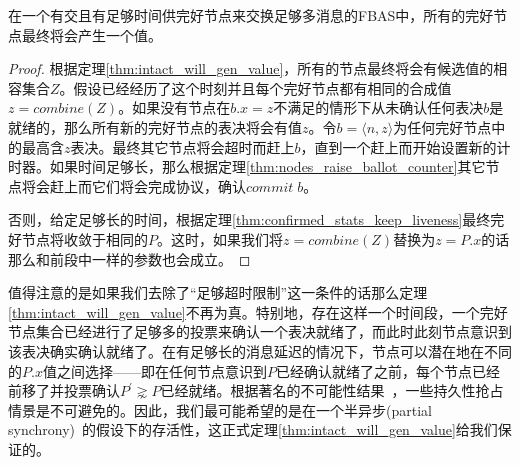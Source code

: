 \begin{theorem}\label{thm:intact_will_gen_value}
        在一个有{\quorum}交且有足够时间供完好节点来交换足够多消息的FBAS中，所有的完好节点最终将会产生一个值。
\end{theorem}

\begin{proof}
        根据定理\ref{thm:intact_will_gen_value}，所有的节点最终将会有候选值的相容集合$Z$。假设已经经历了这个时刻并且每个完好节点都有相同的合成值$z=combine(Z)$。如果没有节点在$b.x=z$不满足的情形下从未确认任何表决$b$是就绪的，那么所有新的完好节点的表决将会有值$z$。令$b=\langle n,z\rangle$为任何完好节点中的最高含$z$表决。最终其它节点将会超时而赶上$b$，直到一个{\quorum}赶上而开始设置新的计时器。如果时间足够长，那么根据定理\ref{thm:nodes_raise_ballot_counter}其它节点将会赶上而它们将会完成协议，确认$commit\;b$。
        
        否则，给定足够长的时间，根据定理\ref{thm:confirmed_stats_keep_liveness}最终完好节点将收敛于相同的$P$。这时，如果我们将$z=combine(Z)$替换为$z=P.x$的话那么和前段中一样的参数也会成立。
\end{proof}

值得注意的是如果我们去除了``足够超时限制''这一条件的话那么定理\ref{thm:intact_will_gen_value}不再为真。特别地，存在这样一个时间段，一个完好节点集合已经进行了足够多的投票来确认一个表决就绪了，而此时此刻节点意识到该表决确实确认就绪了。在有足够长的消息延迟的情况下，节点可以潜在地在不同的$P.x$值之间选择——即在任何节点意识到$P$已经确认就绪了之前，每个节点已经前移了并投票确认$P^{\prime}\gnsim P$已经就绪。根据著名的不可能性结果~\cite{Fischer:1985:IDC:3149.214121}，一些持久性抢占情景是不可避免的。因此，我们最可能希望的是在一个半异步(partial synchrony)~\cite{Dwork:1988:CPP:42282.42283}的假设下的存活性，这正式定理\ref{thm:intact_will_gen_value}给我们保证的。
